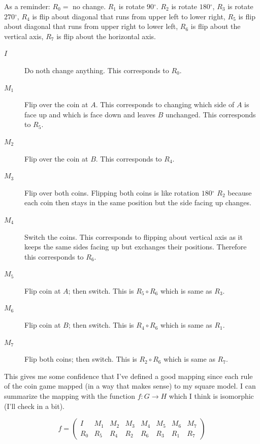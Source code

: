 \documentclass[twoside]{amsart}
\newcommand{\blank}{\vspace{5pt}}
\newcommand{\degree}{\ensuremath{^\circ}}
\begin{document}
\begin{enumerate}[A.]
\begin{enumerate}[1]
		As a reminder: $R_0 = $ no change. $R_1$ is rotate $90\degree$.
		$R_2$ is rotate $180\degree$, $R_3$ is rotate $270\degree$,
		$R_4$ is flip about diagonal that runs from upper left to lower right,
		$R_5$ is flip about diagonal that runs from upper right to lower left,
		$R_6$ is flip about the vertical axis, $R_7$ is flip about the horizontal
		axis.

		\begin{description}
			\item[$I$] Do noth change anything. This corresponds to $R_0$.
			\item[$M_1$] Flip over the coin at $A$. This corresponds to changing
			which side of $A$ is face up and which is face down and leaves $B$
			unchanged. This corresponds to $R_5$.
			\item[$M_2$] Flip over the coin at $B$. This corresponds to
			$R_4$.
			\item[$M_3$] Flip over both coins. Flipping both coins is like 
			rotation $180\degree$ $R_2$ because
			each coin then stays in the same position but the side facing up
			changes.
			\item[$M_4$] Switch the coins. This corresponds to flipping about
			vertical axis as it keeps the same sides facing up but exchanges
			their positions. Therefore this corresponds to $R_6$.
			\item[$M_5$] Flip coin at $A$; then switch. This is $R_5 \circ R_6$
			which is same as $R_3$.
			\item[$M_6$] Flip coin at $B$; then switch. This is $R_4 \circ R_6$
			which is same as $R_1$.
			\item[$M_7$] Flip both coins; then switch. This is $R_2 \circ R_6$
			which is same as $R_7$.
		\end{description}

		This gives me some confidence that I've defined a good mapping since
		each rule of the coin game mapped (in a way that makes sense) to my
		square model. I can summarize the mapping with the function 
		$f : G \to H$ which I think is isomorphic (I'll check in a bit).

		\blank
		\begin{center}
		\[
			f =
			\begin{pmatrix}
				I   & M_1 & M_2 & M_3 & M_4 & M_5 & M_6 & M_7 \\
				R_0 & R_5 & R_4 & R_2 & R_6 & R_3 & R_1 & R_7
			\end{pmatrix}
		\]
		\end{center}
		\blank


\end{enumerate}
\end{enumerate}
\end{document}
